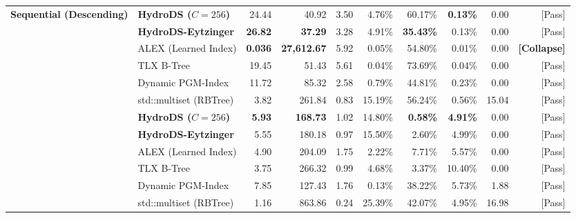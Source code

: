 \documentclass[10pt,twocolumn,letterpaper]{article}
\theoremstyle{definition}
\begin{document}
\begin{table}[t]
\begin{tabular}{@{}llrrrrrrrr@{}}
\midrule
\multirow{6}{*}{\textbf{Sequential (Descending)}}
  & \textbf{HydroDS ($C{=}256$)}   & 24.44 & 40.92 & 3.50 & 4.76\% & 60.17\% & \textbf{0.13\%} & 0.00 & [Pass]\\
  & \textbf{HydroDS-Eytzinger}     & \textbf{26.82} & \textbf{37.29} & 3.28 & 4.91\% & \textbf{35.43\%} & 0.13\% & 0.00 & [Pass]\\
  & ALEX (Learned Index)          & \textbf{0.036} & \textbf{27,612.67} & 5.92 & 0.05\% & 54.80\% & 0.01\% & 0.00 & \textbf{[Collapse]}\\
  & TLX B-Tree                    & 19.45 & 51.43 & 5.61 & 0.04\% & 73.69\% & 0.04\% & 0.00 & [Pass]\\
  & Dynamic PGM-Index             & 11.72 & 85.32 & 2.58 & 0.79\% & 44.81\% & 0.23\% & 0.00 & [Pass]\\
  & std::multiset (RBTree)        & 3.82 & 261.84 & 0.83 & 15.19\% & 56.24\% & 0.56\% & 15.04 & [Pass]\\
\midrule
\rowcolor{rowgray}
\multirow{6}{*}{\textbf{Zipfian Skew ($\theta=0.99$)}}
  & \textbf{HydroDS ($C{=}256$)}   & \textbf{5.93} & \textbf{168.73} & 1.02 & 14.80\% & \textbf{0.58\%} & \textbf{4.91\%} & 0.00 & [Pass]\\
\rowcolor{rowgray}
  & \textbf{HydroDS-Eytzinger}     & 5.55 & 180.18 & 0.97 & 15.50\% & 2.60\% & 4.99\% & 0.00 & [Pass]\\
\rowcolor{rowgray}
  & ALEX (Learned Index)          & 4.90 & 204.09 & 1.75 & 2.22\% & 7.71\% & 5.57\% & 0.00 & [Pass]\\
\rowcolor{rowgray}
  & TLX B-Tree                    & 3.75 & 266.32 & 0.99 & 4.68\% & 3.37\% & 10.40\% & 0.00 & [Pass]\\
\rowcolor{rowgray}
  & Dynamic PGM-Index             & 7.85 & 127.43 & 1.76 & 0.13\% & 38.22\% & 5.73\% & 1.88 & [Pass]\\
\rowcolor{rowgray}
  & std::multiset (RBTree)        & 1.16 & 863.86 & 0.24 & 25.39\% & 42.07\% & 4.95\% & 16.98 & [Pass]\\
\bottomrule
\end{tabular}
\end{table}
\end{document}
